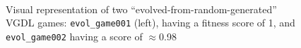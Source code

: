 \documentclass[a4paper,titlepage,final]{report}
\begin{document}
\begin{figure}[!ht]
	\hfill
	\\
    	\caption{Visual representation of two ``evolved-from-random-generated''  VGDL games: \texttt{evol_game001} (left), having a fitness score of 1, and \texttt{evol_game002} having a score of $\approx$0.98}
	\label{fig:evolved_random_game_screenshots}
\end{figure}
\end{document}
